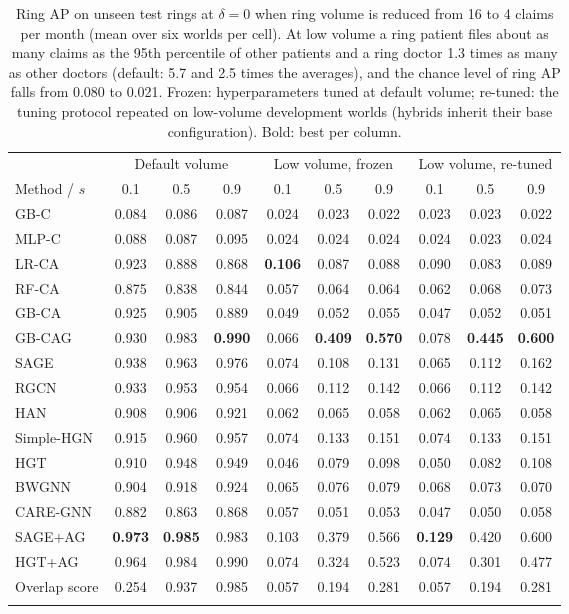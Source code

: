 \begin{table}[h]
\caption{Ring AP on unseen test rings at $\delta=0$ when ring volume is reduced from 16 to 4 claims per month (mean over six worlds per cell). At low volume a ring patient files about as many claims as the 95th percentile of other patients and a ring doctor 1.3 times as many as other doctors (default: 5.7 and 2.5 times the averages), and the chance level of ring AP falls from 0.080 to 0.021. Frozen: hyperparameters tuned at default volume; re-tuned: the tuning protocol repeated on low-volume development worlds (hybrids inherit their base configuration). Bold: best per column.}\label{tab:lowvolume}
\scriptsize
\setlength{\tabcolsep}{3.5pt}
\begin{tabular}{@{}lccccccccc@{}}
\toprule
 & \multicolumn{3}{c}{Default volume} & \multicolumn{3}{c}{Low volume, frozen} & \multicolumn{3}{c}{Low volume, re-tuned} \\
\cmidrule(lr){2-4}\cmidrule(lr){5-7}\cmidrule(lr){8-10}
Method / $s$ & 0.1 & 0.5 & 0.9 & 0.1 & 0.5 & 0.9 & 0.1 & 0.5 & 0.9 \\
\midrule
GB-C & 0.084 & 0.086 & 0.087 & 0.024 & 0.023 & 0.022 & 0.023 & 0.023 & 0.022 \\
MLP-C & 0.088 & 0.087 & 0.095 & 0.024 & 0.024 & 0.024 & 0.024 & 0.023 & 0.024 \\
LR-CA & 0.923 & 0.888 & 0.868 & \textbf{0.106} & 0.087 & 0.088 & 0.090 & 0.083 & 0.089 \\
RF-CA & 0.875 & 0.838 & 0.844 & 0.057 & 0.064 & 0.064 & 0.062 & 0.068 & 0.073 \\
GB-CA & 0.925 & 0.905 & 0.889 & 0.049 & 0.052 & 0.055 & 0.047 & 0.052 & 0.051 \\
GB-CAG & 0.930 & 0.983 & \textbf{0.990} & 0.066 & \textbf{0.409} & \textbf{0.570} & 0.078 & \textbf{0.445} & \textbf{0.600} \\
\midrule
SAGE & 0.938 & 0.963 & 0.976 & 0.074 & 0.108 & 0.131 & 0.065 & 0.112 & 0.162 \\
RGCN & 0.933 & 0.953 & 0.954 & 0.066 & 0.112 & 0.142 & 0.066 & 0.112 & 0.142 \\
HAN & 0.908 & 0.906 & 0.921 & 0.062 & 0.065 & 0.058 & 0.062 & 0.065 & 0.058 \\
Simple-HGN & 0.915 & 0.960 & 0.957 & 0.074 & 0.133 & 0.151 & 0.074 & 0.133 & 0.151 \\
HGT & 0.910 & 0.948 & 0.949 & 0.046 & 0.079 & 0.098 & 0.050 & 0.082 & 0.108 \\
\midrule
BWGNN & 0.904 & 0.918 & 0.924 & 0.065 & 0.076 & 0.079 & 0.068 & 0.073 & 0.070 \\
CARE-GNN & 0.882 & 0.863 & 0.868 & 0.057 & 0.051 & 0.053 & 0.047 & 0.050 & 0.058 \\
\midrule
SAGE+AG & \textbf{0.973} & \textbf{0.985} & 0.983 & 0.103 & 0.379 & 0.566 & \textbf{0.129} & 0.420 & 0.600 \\
HGT+AG & 0.964 & 0.984 & 0.990 & 0.074 & 0.324 & 0.523 & 0.074 & 0.301 & 0.477 \\
Overlap score & 0.254 & 0.937 & 0.985 & 0.057 & 0.194 & 0.281 & 0.057 & 0.194 & 0.281 \\
\botrule
\end{tabular}
\end{table}